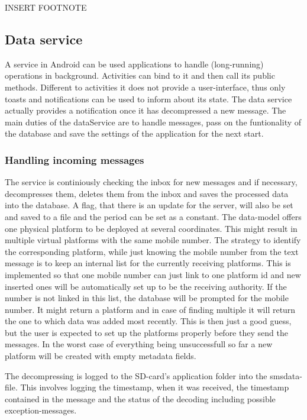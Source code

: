 \documentclass[11pt,oneside,a4paper]{scrartcl}
\begin{document}
INSERT FOOTNOTE

\subsection{Data service}
A service in Android can be used applications to handle (long-running) operations in background. Activities can bind to it and then call its public methods. Different to activities it does not provide a user-interface, thus only toasts and notifications can be used to inform about its state. The data service actually provides a notification once it has decompressed a new message.
The main duties of the dataService are to handle messages, pass on the funtionality of the database and save the settings of the application for the next start.

\subsubsection{Handling incoming messages}
The service is continiously checking the inbox for new messages and if necessary, decompresses them, deletes them from the inbox and saves the processed data into the database. A flag, that there is an update for the server, will also be set and saved to a file and the period can be set as a constant.
The data-model offers one physical platform to be deployed at several coordinates. This might result in multiple virtual platforms with the same mobile number. The strategy to identify the corresponding platform, while just knowing the mobile number from the text message is to keep an internal list for the currently receiving platforms. This is implemented so that one mobile number can just link to one platform id and new inserted ones will be automatically set up to be the receiving authority.
If the number is not linked in this list, the database will be prompted for the mobile number. It might return a platform and in case of finding multiple it will return the one to which data was added most recently. This is then just a good guess, but the user is expected to set up the platforms properly before they send the messages. In the worst case of everything being unsuccessfull so far a new platform will be created with empty metadata fields. 

The decompressing is logged to the SD-card's application folder into the smsdata-file. This involves logging the timestamp, when it was received, the timestamp contained in the message and the status of the decoding including possible exception-messages.
\end{document}

